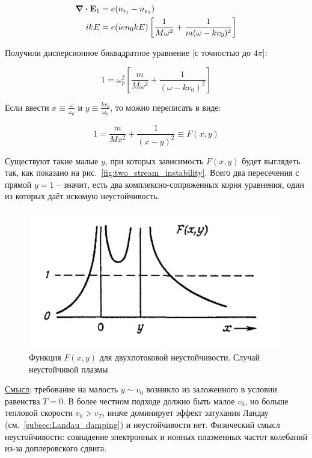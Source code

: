 \documentclass[10pt, a4paper]{article}
\begin{document}
\begin{itemize}
\begin{itemize}
		\begin{align*}
			\div{\vb{E}_1} &= e(n_{i_1}-n_{e_1}) \\
			ik E &= e(ien_0kE) \left[ \frac{1}{M\omega^2} + \frac{1}{m(\omega - kv_0)^2}\right] 
		\end{align*}
		
		Получили дисперсионное биквадратное уравнение [с точностью до $4\pi$]:
		
		\begin{equation*}
			1 = \omega_p^2\left[\frac{m}{M\omega^2} + \frac{1}{(\omega - kv_0)^2}\right] 
		\end{equation*}
	
		Если ввести $x\equiv\frac{\omega}{\omega_p}$ и $y\equiv\frac{kv_0}{\omega_p}$, то можно переписать в виде:
		
		\begin{equation*}
			1 = \frac{m}{Mx^2}+\frac{1}{(x-y)^2} \equiv F(x, y)
		\end{equation*}
		 
		Существуют такие малые $y$, при которых зависимость $F(x,y)$ будет выглядеть так, как показано на рис.~\eqref{fig:two_stream_instability}. Всего два пересечения с прямой $y=1$ -- значит, есть два комплексно-сопряженных корня уравнения, один из которых даёт искомую неустойчивость.
		
		\begin{figure}[ht]
			\begin{center}
				\includegraphics[width=0.5\linewidth]{two_stream_instability}
			\end{center}
			\caption{Функция $F(x,y)$ для двухпотоковой неустойчивости. Случай неустойчивой плазмы~\cite{chen}}
			\label{fig:two_stream_instability} 
		\end{figure}
		
		\uline{Смысл}: требование на малость $y\sim v_0$ возникло из заложенного в условии равенства $T=0$. В более честном подходе должно быть малое $v_0$, но больше тепловой скорости $v_0>v_T$, иначе доминирует эффект затухания Ландау (см.~\ref{subsec:Landau_damping}) и неустойчивости нет. Физический смысл неустойчивости: совпадение электронных и ионных плазменных частот колебаний из-за доплеровского сдвига.
		

\end{itemize}
\end{itemize}
\end{document}
